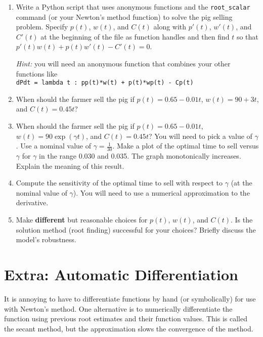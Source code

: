 \documentclass[letter]{article}
\begin{document}
\begin{enumerate}[resume]

\item Write a Python script that uses anonymous functions and the \verb|root_scalar| command (or your Newton's method function) to solve the pig selling problem. Specify $p(t)$, $w(t)$, and $C(t)$ along with $p'(t)$, $w'(t)$, and $C'(t)$ at the beginning of the file as function handles and then find $t$ so that $p'(t)w(t) + p(t)w'(t) - C'(t) = 0$. 

	\textit{Hint:} you will need an anonymous function that combines your other functions like \\
	\verb|dPdt = lambda t : pp(t)*w(t) + p(t)*wp(t) - Cp(t)|

\item When should the farmer sell the pig if $p(t) = 0.65-0.01t$, $w(t) = 90+3t$, and $C(t) = 0.45t$? 

\item When should the farmer sell the pig if $p(t) = 0.65-0.01t$, $w(t) = 90\exp(\gamma t)$, and $C(t) = 0.45t$? You will need to pick a value of $\gamma$. Use a nominal value of $\gamma=\frac{1}{30}$. Make a plot of the optimal time to sell versus $\gamma$ for $\gamma$ in the range 0.030 and 0.035. The graph monotonically increases. Explain the meaning of this result. 

\item Compute the sensitivity of the optimal time to sell with respect to $\gamma$ (at the nominal value of $\gamma$). You will need to use a numerical approximation to the derivative.

\item Make \textbf{different} but reasonable choices for $p(t)$, $w(t)$, and $C(t)$. Is the solution method (root finding) successful for your choices? Briefly discuss the model's robustness.

\end{enumerate}

\section{Extra: Automatic Differentiation}

It is annoying to have to differentiate functions by hand (or symbolically) for use with Newton's method. One alternative is to numerically differentiate the function using previous root estimates and their function values. This is called the secant method, but the approximation slows the convergence of the method. 
\end{document}
